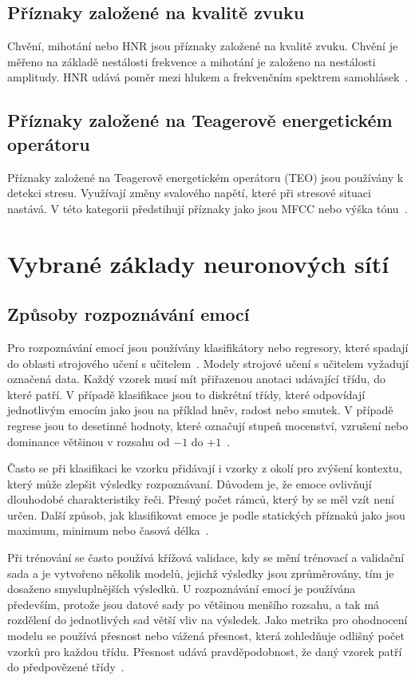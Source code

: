 \documentclass[FM,BP]{tulthesis}
\begin{document}
\section{Příznaky založené na kvalitě zvuku}  %
Chvění, mihotání nebo HNR jsou příznaky založené na kvalitě zvuku. Chvění je měřeno na základě nestálosti frekvence a mihotání je založeno na nestálosti amplitudy. HNR udává poměr mezi hlukem a frekvenčním spektrem samohlásek~\cite{DBLP:journals/speech/AkcayO20}.

\section{Příznaky založené na Teagerově energetickém operátoru}  %
Příznaky založené na Teagerově energetickém operátoru (TEO) jsou používány k detekci stresu. Využívají změny svalového napětí, které při stresové situaci nastává. V této kategorii předstihují příznaky jako jsou MFCC nebo výška tónu~\cite{DBLP:journals/speech/AkcayO20}.

\chapter{Vybrané základy neuronových sítí}

\section{Způsoby rozpoznávání emocí}  %
Pro rozpoznávání emocí jsou používány klasifikátory nebo regresory, které spadají do oblasti strojového učení s učitelem~\cite{DBLP:journals/speech/AkcayO20}. Modely strojové učení s učitelem vyžadují označená data. Každý vzorek musí mít přiřazenou anotaci udávající třídu, do které patří. V případě klasifikace jsou to diskrétní třídy, které odpovídají jednotlivým emocím jako jsou na příklad hněv, radost nebo smutek. V případě regrese jsou to desetinné hodnoty, které označují stupeň mocenství, vzrušení nebo dominance většinou v rozsahu od $-1$ do $+1$~\cite{konar_chakraborty_2015}.

Často se při klasifikaci ke vzorku přidávají i vzorky z okolí pro zvýšení kontextu, který může zlepšit výsledky rozpoznávaní. Důvodem je, že emoce ovlivňují dlouhodobé charakteristiky řeči. Přesný počet rámců, který by se měl vzít není určen. Další způsob, jak klasifikovat emoce je podle statických příznaků jako jsou maximum, minimum nebo časová délka~\cite{konar_chakraborty_2015}.

Při trénování se často používá křížová validace, kdy se mění trénovací a validační sada a je vytvořeno několik modelů, jejichž výsledky jsou zprůměrovány, tím je dosaženo smysluplnějších výsledků. U rozpoznávání emocí je používána především, protože jsou datové sady po většinou menšího rozsahu, a tak má rozdělení do jednotlivých sad větší vliv na výsledek. Jako metrika pro ohodnocení modelu se používá přesnost nebo vážená přesnost, která zohledňuje odlišný počet vzorků pro každou třídu. Přesnost udává pravděpodobnost, že daný vzorek patří do předpovězené třídy~\cite{konar_chakraborty_2015}.
\end{document}

